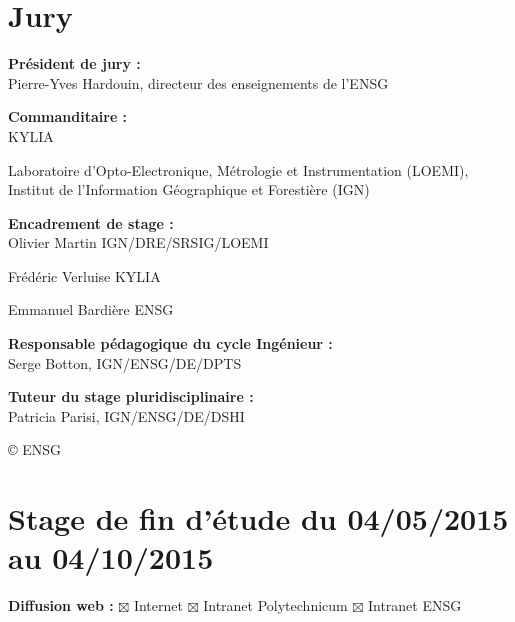 \newevenpage
\thispagestyle{plain}
\section*{Jury}
\vspace{0.5cm}

\textbf{Président de jury :} \\

Pierre-Yves Hardouin, directeur des enseignements de l'ENSG

\vspace{0.5cm}

\textbf{Commanditaire :} \\

KYLIA


Laboratoire d’Opto-Electronique, Métrologie et Instrumentation (LOEMI), Institut de l’Information Géographique et Forestière (IGN)

\vspace{0.5cm}

\textbf{Encadrement de stage :} \\ 

Olivier Martin IGN/DRE/SRSIG/LOEMI

Frédéric Verluise KYLIA

Emmanuel Bardière ENSG

\vspace{0.5cm}

\textbf{Responsable pédagogique du cycle Ingénieur :} \\

Serge Botton, IGN/ENSG/DE/DPTS

\vspace{0.5cm}

\textbf{Tuteur du stage pluridisciplinaire :} \\

Patricia Parisi, IGN/ENSG/DE/DSHI

\vspace{1cm}

\copyright \hspace{0.3cm} ENSG

\section*{Stage de fin d'étude du 04/05/2015 au 04/10/2015 }
\vspace{0.3cm}
\textbf{Diffusion web :} $\boxtimes$ Internet \hspace{0.2cm}$\boxtimes$ Intranet Polytechnicum\hspace{0.2cm}
$\boxtimes$ Intranet ENSG\vspace{0.3cm}

